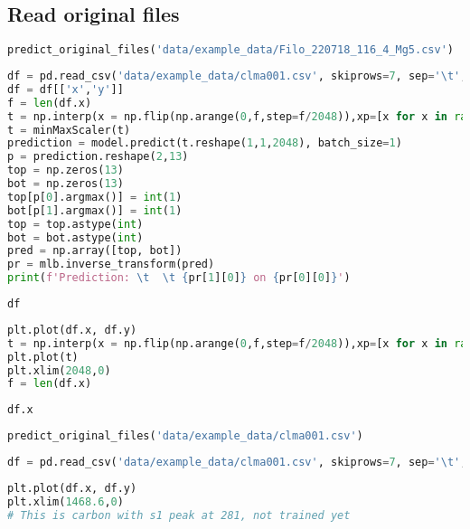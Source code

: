 \hypertarget{read-original-files}{%
\subsection{Read original files}\label{read-original-files}}

\begin{lstlisting}[language=Python]
predict_original_files('data/example_data/Filo_220718_116_4_Mg5.csv')
\end{lstlisting}

\begin{lstlisting}[language=Python]
df = pd.read_csv('data/example_data/clma001.csv', skiprows=7, sep='\t', names=['x', 'y', 'z', 'a'])
df = df[['x','y']]
f = len(df.x)
t = np.interp(x = np.flip(np.arange(0,f,step=f/2048)),xp=[x for x in range(f)], fp=df.y)
t = minMaxScaler(t)
prediction = model.predict(t.reshape(1,1,2048), batch_size=1)
p = prediction.reshape(2,13)
top = np.zeros(13)
bot = np.zeros(13)
top[p[0].argmax()] = int(1)
bot[p[1].argmax()] = int(1)
top = top.astype(int)
bot = bot.astype(int)
pred = np.array([top, bot])
pr = mlb.inverse_transform(pred)
print(f'Prediction: \t  \t {pr[1][0]} on {pr[0][0]}')
\end{lstlisting}

\begin{lstlisting}[language=Python]
df
\end{lstlisting}

\begin{lstlisting}[language=Python]
plt.plot(df.x, df.y)
t = np.interp(x = np.flip(np.arange(0,f,step=f/2048)),xp=[x for x in range(f)], fp=df.y)
plt.plot(t)
plt.xlim(2048,0)
f = len(df.x)
\end{lstlisting}

\begin{lstlisting}[language=Python]
df.x
\end{lstlisting}

\begin{lstlisting}[language=Python]
predict_original_files('data/example_data/clma001.csv')
\end{lstlisting}

\begin{lstlisting}[language=Python]
df = pd.read_csv('data/example_data/clma001.csv', skiprows=7, sep='\t', names=['x', 'y', 'z', 'a'])
\end{lstlisting}

\begin{lstlisting}[language=Python]
plt.plot(df.x, df.y)
plt.xlim(1468.6,0)
# This is carbon with s1 peak at 281, not trained yet
\end{lstlisting}

